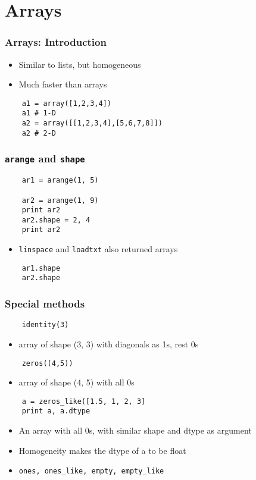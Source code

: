 \section{Arrays}

\begin{frame}[fragile]
  \frametitle{Arrays: Introduction}
  \begin{itemize}
  \item Similar to lists, but homogeneous
  \item Much faster than arrays
  \end{itemize}
  \begin{lstlisting}
    a1 = array([1,2,3,4])
    a1 # 1-D
    a2 = array([[1,2,3,4],[5,6,7,8]])
    a2 # 2-D
  \end{lstlisting}
\end{frame}

\begin{frame}[fragile]
  \frametitle{\texttt{arange} and \texttt{shape}}
  \begin{lstlisting}
    ar1 = arange(1, 5)

    ar2 = arange(1, 9) 
    print ar2
    ar2.shape = 2, 4
    print ar2
  \end{lstlisting}
  \begin{itemize}
  \item \texttt{linspace} and \texttt{loadtxt} also returned arrays
  \end{itemize}
  \begin{lstlisting}
    ar1.shape
    ar2.shape
  \end{lstlisting}
\end{frame}

\begin{frame}[fragile]
  \frametitle{Special methods}
  \begin{lstlisting}
    identity(3)
  \end{lstlisting}
  \begin{itemize}
  \item array of shape (3, 3) with diagonals as 1s, rest 0s
  \end{itemize}
  \begin{lstlisting}
    zeros((4,5))
  \end{lstlisting}
  \begin{itemize}
  \item array of shape (4, 5) with all 0s
  \end{itemize}
  \begin{lstlisting}
    a = zeros_like([1.5, 1, 2, 3]
    print a, a.dtype
  \end{lstlisting}
  \begin{itemize}
  \item An array with all 0s, with similar shape and dtype as argument
  \item Homogeneity makes the dtype of a to be float
  \item \texttt{ones, ones\_like, empty, empty\_like}
  \end{itemize}
\end{frame}

